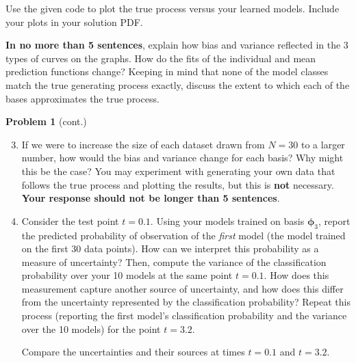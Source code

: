 \documentclass[submit]{../harvardml}
\begin{document}
\begin{problem}
\begin{enumerate}
        Use the given code to plot the true process versus your learned models. Include your plots in your solution PDF.

        \textbf{In no more than 5 sentences}, explain how bias and variance reflected in the 3 types of curves on the graphs.  How do the fits of the individual and mean prediction functions change?  Keeping in mind that none of the model classes match the true generating process exactly, discuss the extent to which each of the bases approximates the true process.

\end{enumerate}
\end{problem}

\newpage
\begin{framed}
  \noindent\textbf{Problem 1} (cont.)\\
  \begin{enumerate}
    \setcounter{enumi}{2}

    \item If we were to increase the size of each dataset drawn from $N = 30$ to a larger number, how would the bias and variance change for each basis? Why might this be the case? You may experiment with generating your own data that follows the true process and plotting the results, but this is \textbf{not} necessary. \textbf{Your response should not be longer than 5 sentences}.

    \item Consider the test point $t = 0.1$. Using your models trained on basis $\boldsymbol\phi_3$, report the predicted probability of observation of the \textit{first} model (the model trained on the first 30 data points). How can we interpret this probability as a measure of uncertainty? Then, compute the variance of the classification probability over your 10 models at the same point $t = 0.1$. How does this measurement capture another source of uncertainty, and how does this differ from the uncertainty represented by the classification probability? Repeat this process (reporting the first model's classification probability and the variance over the 10 models) for the point $t = 3.2$.

          Compare the uncertainties and their sources at times $t=0.1$ and $t=3.2$.


\end{enumerate}
\end{framed}
\end{document}
